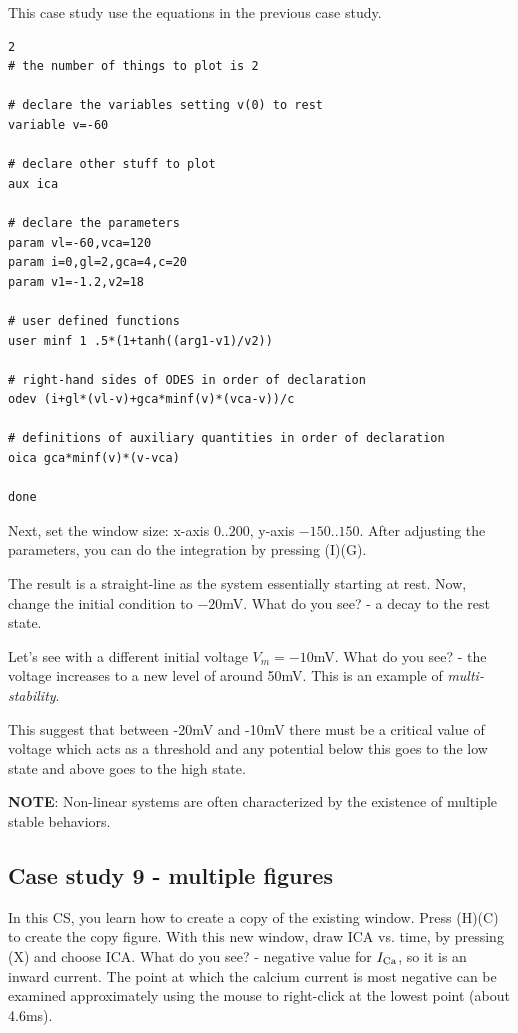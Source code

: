 This case study use the equations in the previous case study.
\begin{verbatim}
2
# the number of things to plot is 2

# declare the variables setting v(0) to rest
variable v=-60

# declare other stuff to plot
aux ica

# declare the parameters
param vl=-60,vca=120
param i=0,gl=2,gca=4,c=20
param v1=-1.2,v2=18

# user defined functions 
user minf 1 .5*(1+tanh((arg1-v1)/v2))

# right-hand sides of ODES in order of declaration
odev (i+gl*(vl-v)+gca*minf(v)*(vca-v))/c

# definitions of auxiliary quantities in order of declaration
oica gca*minf(v)*(v-vca)

done
\end{verbatim}

Next, set the window size: x-axis $0..200$, y-axis $-150..150$.  After
adjusting the parameters, you can do the integration by pressing
(I)(G).


The result is a straight-line as the system essentially starting at
rest. Now, change the initial condition to $-20$mV. What do you see? -
a decay to the rest state.


Let's see with a different initial voltage $V_m=-10$mV. What do you
see? - the voltage increases to a new level of around 50mV. This is an
example of {\it multi-stability}. 

This suggest that between -20mV and -10mV there must be a critical
value  of voltage which acts as a threshold and any potential below
this goes to the low state and above goes to the high state. 

{\bf NOTE}: Non-linear systems are often characterized by the
existence of multiple stable behaviors.

\subsection{Case study 9 - multiple figures}
\label{sec:case-study-9}

In this CS, you learn how to create a copy of the existing window.
Press (H)(C) to create the copy figure. With this new window, draw ICA
vs. time, by pressing (X) and choose ICA.
What do you see? - negative value for $I_{\ce{Ca}}$, so it is an inward
current. The point at which the calcium current is most negative can
be examined approximately using the mouse to right-click at the lowest
point (about 4.6ms).

